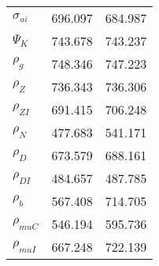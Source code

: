 \begin{center}
\begin{longtable}{lcc}
$ {\sigma_{ai}}        $	 & 	     696.097	 & 	     684.987 \\ 
$ {\Psi_{K}}           $	 & 	     743.678	 & 	     743.237 \\ 
$ {\rho_g}             $	 & 	     748.346	 & 	     747.223 \\ 
$ {\rho_Z}             $	 & 	     736.343	 & 	     736.306 \\ 
$ {\rho_{ZI}}          $	 & 	     691.415	 & 	     706.248 \\ 
$ {\rho_N}             $	 & 	     477.683	 & 	     541.171 \\ 
$ {\rho_D}             $	 & 	     673.579	 & 	     688.161 \\ 
$ {\rho_{DI}}          $	 & 	     484.657	 & 	     487.785 \\ 
$ {\rho_b}             $	 & 	     567.408	 & 	     714.705 \\ 
$ {\rho_{muC}}         $	 & 	     546.194	 & 	     595.736 \\ 
$ {\rho_{muI}}         $	 & 	     667.248	 & 	     722.139 \\ 
\end{longtable}
 \end{center}
